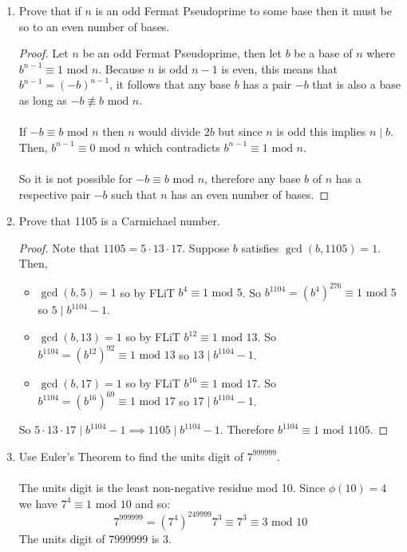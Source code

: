 \documentclass[class=article, crop=false]{standalone}
\begin{document}
\begin{enumerate}
\item
  Prove that if $n$ is an odd Fermat Pseudoprime to some base
  then it must be so to an even number of bases.
  \begin{proof}
	Let $n$ be an odd Fermat Pseudoprime, then let $b$ be a base of $n$ where $b^{n-1}\equiv 1\mbox{ mod }n$.
	Because $n$ is odd $n-1$ is even, this means that $b^{n-1} = (-b)^{n-1}$, it follows that any base $b$
	has a pair $-b$ that is also a base as long as $-b\not\equiv b\mbox{ mod }n$.\\\\
	If $-b\equiv b\mbox{ mod }n$ then $n$ would divide $2b$ but since $n$ is odd this implies $n\mid b$.
	Then, $b^{n-1} \equiv 0\mbox{ mod }n$ which contradicts $b^{n-1}\equiv 1\mbox{ mod }n$.\\\\
	So it is not possible for $-b\equiv b\mbox{ mod }n$, therefore any base $b$ of $n$ has a respective pair
	$-b$ such that $n$ has an even number of bases.
  \end{proof}

\item
  Prove that 1105 is a Carmichael number.
  \begin{proof}
	  Note that $1105=5\cdot 13\cdot 17$. Suppose $b$ satisfies $\gcd(b,1105)=1$. Then,
	\begin{itemize}
	  \item $\gcd(b,5)=1$ so by FLiT $b^4 \equiv 1\mbox{ mod }5$. So
	  $b^{1104}=(b^4)^{276}\equiv 1 \mbox{ mod }5$ so $5\mid b^{1104}-1$.

	  \item $\gcd(b,13)=1$ so by FLiT $b^{12}\equiv 1\mbox{ mod }13$. So
	  $b^{1104}=(b^{12})^{92}\equiv 1\mbox{ mod }13$ so $13\mid b^{1104}-1$.

	  \item $\gcd(b,17)=1$ so by FLiT $b^{16}\equiv 1\mbox{ mod }17$. So
	  $b^{1104}=(b^{16})^{69}\equiv 1 \mbox{ mod }17$ so $17\mid b^{1104}-1$. 
	\end{itemize}
	So $5\cdot 13\cdot 17 \mid b^{1104}-1 \implies 1105\mid b^{1104}-1$.
	Therefore $b^{1104} \equiv 1\mbox{ mod }1105$.
  \end{proof}

\item
  Use Euler's Theorem to find the units digit of $7^{999999}$.\\\\
  The units digit is the least non-negative residue mod 10.
  Since $\phi(10)=4$ we have $7^{4} \equiv 1 \mbox{ mod }10$ and so:
  $$7^{999999}=(7^4)^{249999} 7^3\equiv 7^3 \equiv 3\mbox{ mod }10$$
  The units digit of $7{999999}$ is $3$.


\end{enumerate}
\end{document}
